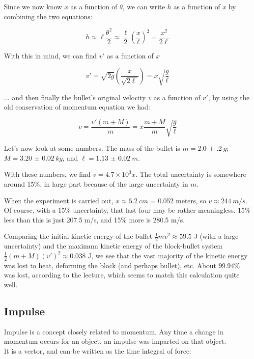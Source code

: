Since we now know $x$ as a function of $\theta$, we can write $h$ as a function of $x$ by combining the two equations:

\begin{equation}
h \approx \ell \frac{\theta^2}{2} \approx \frac{\ell}{2} \left(\frac{x}{\ell}\right)^2 = \frac{x^2}{2 \ell}
\end{equation}

With this in mind, we can find $v'$ as a function of $x$

\begin{equation}
v' = \sqrt{2 g} (\frac{x}{\sqrt{2 \ell}}) = x \sqrt{\frac{g}{\ell}}
\end{equation}

... and then finally the bullet's original velocity $v$ as a function of $v'$, by using the old conservation of momentum equation we had:

\begin{equation}
v = \frac{v'(m + M)}{m} = x \frac{m + M}{m} \sqrt{\frac{g}{\ell}}
\end{equation}

Let's now look at some numbers. The mass of the bullet is $m = \SI{2.0(2)}{g}$; $M = \SI{3.20(2)}{kg}$, and $\ell = \SI{1.13(2)}{m}$.

With these numbers, we find $v = 4.7 \times 10^{3} x$. The total uncertainty is somewhere around 15\%, in large part because of the large uncertainty in $m$.

When the experiment is carried out, $x \approx \SI{5.2}{cm}$ = 0.052 meters, so $v \approx \SI{244}{m/s}$. Of course, with a 15\% uncertainty, that last four may be rather meaningless. 15\% less than this is just 207.5 m/s, and 15\% more is 280.5 m/s.

Comparing the initial kinetic energy of the bullet $\displaystyle \frac{1}{2} m v^2 \approx 59.5$ J (with a large uncertainty) and the maximum kinetic energy of the block-bullet system $\displaystyle \frac{1}{2} (m + M) (v')^2 \approx 0.038$ J, we see that the vast majority of the kinetic energy was lost to heat, deforming the block (and perhaps bullet), etc. About 99.94\% was lost, according to the lecture, which seems to match this calculation quite well.

\subsection{Impulse}

Impulse is a concept closely related to momentum. Any time a change in momentum occurs for an object, an impulse was imparted on that object.\\
It is a vector, and can be written as the time integral of force:

